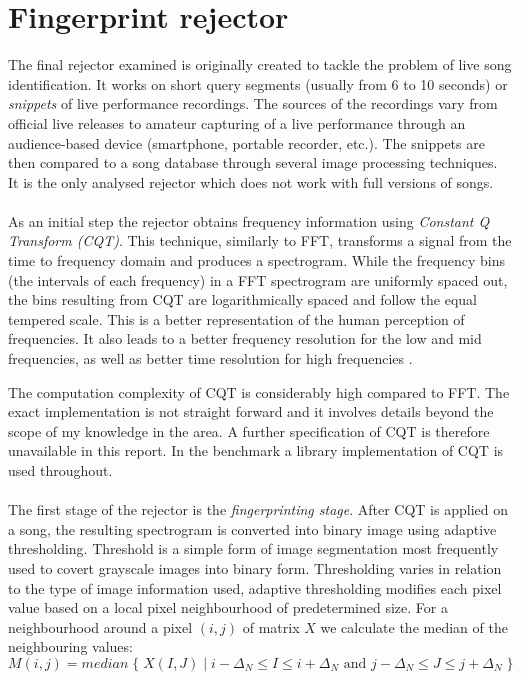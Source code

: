 \section{Fingerprint rejector} 
\label{sec:rafii}

The final rejector examined is originally created to tackle the problem of live
song identification. It works on short query segments (usually from 6 to 10
seconds) or \textit{snippets} of live performance recordings. The sources of the
recordings vary from official live releases to amateur capturing of a live
performance through an audience-based device (smartphone, portable recorder,
etc.). The snippets are then compared to a song database through several image
processing techniques. It is the only analysed rejector which does not work with
full versions of songs.

\paragraph{}
As an initial step the rejector obtains frequency information using
\textit{Constant Q Transform (CQT)}. This technique, similarly to FFT,
transforms a signal from the time to frequency domain and produces a
spectrogram. While the frequency bins (the intervals of each frequency) in a FFT
spectrogram are uniformly spaced out, the bins resulting from CQT are
logarithmically spaced and follow the equal tempered scale. This is a better
representation of the human perception of frequencies. It also leads to a better
frequency resolution for the low and mid frequencies, as well as better time
resolution for high frequencies \cite{schorkhuber2010constant}.

The computation complexity of CQT is considerably high compared to FFT. The
exact implementation is not straight forward and it involves details beyond the
scope of my knowledge in the area. A further specification of CQT is therefore
unavailable in this report. In the benchmark a library implementation of CQT is
used throughout.

\paragraph{}
The first stage of the rejector is the \textit{fingerprinting stage}. After CQT
is applied on a song, the resulting spectrogram is converted into binary image
using adaptive thresholding. Threshold is a simple form of image segmentation
most frequently used to covert grayscale images into binary form. Thresholding
varies in relation to the type of image information used, adaptive thresholding
modifies each pixel value based on a local pixel neighbourhood of predetermined
size. For a neighbourhood around a pixel $(i, j)$ of matrix $X$ we calculate the
median of the neighbouring values:
\begin{equation}
   M(i, j) = median\; \{\; X(I, J) \mid i-\Delta_N \leq I \leq i+\Delta_N \text{ and } j-\Delta_N \leq J \leq j+\Delta_N \; \}
\end{equation}

